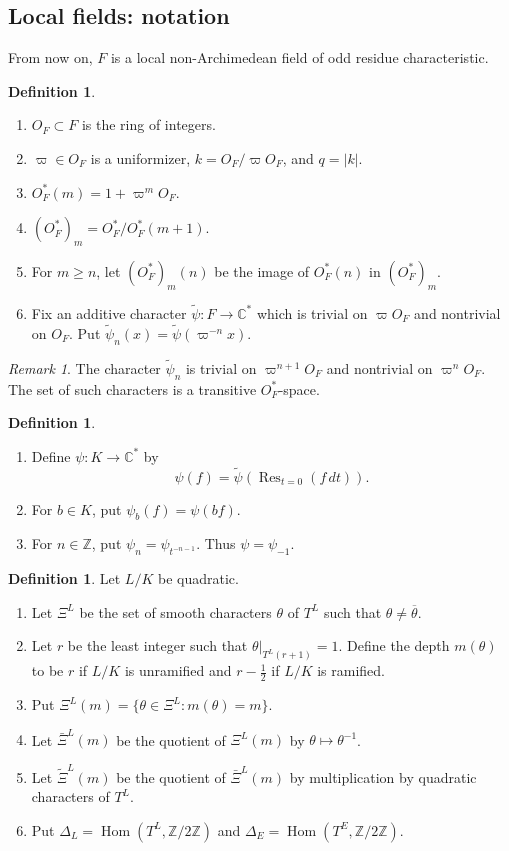 \documentclass[11pt,a4paper,twoside]{amsart}
\theoremstyle{definition}
\newtheorem{definition}[theorem]{Definition}
\theoremstyle{remark}
\newtheorem{remark}[theorem]{Remark}
\newcommand{\D}{\Delta}
\newcommand{\CC}{\mathbb C}
\newcommand{\ZZ}{\mathbb Z}
\newcommand{\ti}{\widetilde}
\newcommand{\Hom}{\operatorname{Hom}}
\begin{document}
\subsection{Local fields: notation}
From now on, $F$ is a local non-Archimedean field of odd residue characteristic.
\begin{definition}\label{ti-psi}
\begin{enumerate}
\item $O_F\subset F$ is the ring of integers.
\item $\varpi\in O_F$ is a uniformizer, $k=O_F/\varpi O_F$, and $q=|k|$.
\item $O_F^*(m)=1+\varpi^mO_F$.
\item $(O_F^*)_m=O_F^*/O_F^*(m+1)$.
\item For $m\geq n$, let $(O_F^*)_m(n)$ be the image of $O_F^*(n)$ in $(O_F^*)_m$.
\item Fix an additive character $\widetilde\psi:F\to\CC^*$ which is trivial on $\varpi O_F$ and nontrivial on $O_F$. Put $\widetilde\psi_n(x)=\widetilde\psi(\varpi^{-n}x)$.
\end{enumerate}
\end{definition}
\begin{remark}
The character $\widetilde\psi_n$ is trivial on $\varpi^{n+1}O_F$ and nontrivial on $\varpi^nO_F$. The set of such characters is a transitive $O_F^*$-space.
\end{remark}
\begin{definition}\label{psi}
\begin{enumerate}
\item Define $\psi:K\to\CC^*$ by
$$
\psi(f)=\widetilde\psi\left(\operatorname{Res}_{t=0}(f\,dt)\right).
$$
\item For $b\in K$, put $\psi_b(f)=\psi(bf)$.
\item For $n\in\ZZ$, put $\psi_n=\psi_{t^{-n-1}}$. Thus $\psi=\psi_{-1}$.
\end{enumerate}
\end{definition}
\begin{definition}\label{qext1}
Let $L/K$ be quadratic.
\begin{enumerate}
\item Let $\Xi^L$ be the set of smooth characters $\theta$ of $T^L$ such that $\theta\neq\overline\theta$.
\item Let $r$ be the least integer such that $\theta|_{T^L(r+1)}=1$. Define the depth $m(\theta)$ to be $r$ if $L/K$ is unramified and $r-\frac{1}{2}$ if $L/K$ is ramified.
\item Put $\Xi^L(m)=\{\theta\in\Xi^L:m(\theta)=m\}$.
\item Let $\bar\Xi^L(m)$ be the quotient of $\Xi^L(m)$ by $\theta\mapsto\theta^{-1}$.
\item Let $\ti\Xi^L(m)$ be the quotient of $\bar\Xi^L(m)$ by multiplication by quadratic characters of $T^L$.
\item Put $\D_L=\Hom(T^L,\ZZ/2\ZZ)$ and $\D_E=\Hom(T^E,\ZZ/2\ZZ)$.
\end{enumerate}
\end{definition}
\end{document}
